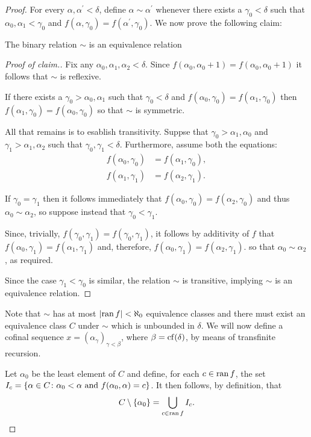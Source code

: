\begin{proof}
	For every $\alpha,\alpha^\prime<\delta$, define $\alpha\sim\alpha^\prime$ whenever there exists a $\gamma_0<\delta$ such that $\alpha_0,\alpha_1<\gamma_0$ and $f(\alpha,\gamma_0)=f(\alpha^\prime,\gamma_0)$.  We now prove the following claim:
	\begin{claim}
		The binary relation $\sim$ is an equivalence relation
	\end{claim}
	\begin{proof}[Proof of claim.]
		Fix any $\alpha_0,\alpha_1,\alpha_2<\delta$.  Since $f(\alpha_0,\alpha_0+1)=f(\alpha_0,\alpha_0+1)$ it follows that $\sim$ is reflexive.

		If there exists a $\gamma_0>\alpha_0,\alpha_1$ such that $\gamma_0<\delta$ and $f(\alpha_0,\gamma_0)=f(\alpha_1,\gamma_0)$ then $f(\alpha_1,\gamma_0)=f(\alpha_0,\gamma_0)$ so that $\sim$ is symmetric.

		All that remains is to esablish transitivity.
		Suppse that $\gamma_0>\alpha_1,\alpha_0$ and $\gamma_1>\alpha_1,\alpha_2$
		such that $\gamma_0,\gamma_1<\delta$.  Furthermore, assume both the
		equations:
		\begin{align}
			f(\alpha_0,\gamma_0)&=f(\alpha_1,\gamma_0),\\
			f(\alpha_1,\gamma_1)&=f(\alpha_2,\gamma_1).
		\end{align}

		If $\gamma_0=\gamma_1$ then it follows immediately that
		$f(\alpha_0,\gamma_0)=f(\alpha_2,\gamma_0)$ and thus
		$\alpha_0\sim\alpha_2$, so suppose instead that $\gamma_0<\gamma_1$.

		Since, trivially, $f(\gamma_0,\gamma_1)=f(\gamma_0,\gamma_1)$, it
		follows by additivity of $f$ that
		$f(\alpha_0,\gamma_1)=f(\alpha_1,\gamma_1)$ and, therefore,
		$f(\alpha_0,\gamma_1)=f(\alpha_2,\gamma_1)$. so that
		$\alpha_0\sim\alpha_2$, as required.\noqed

		Since the case $\gamma_1<\gamma_0$ is similar, the relation $\sim$ is
		transitive, implying $\sim$ is an equivalence relation.
	\end{proof}

	Note that $\sim$ has at most $\left\lvert\operatorname{ran} f\right\rvert<\aleph_0$ equivalence classes
	and there must exist an equivalence class $C$ under $\sim$ which is
	unbounded in $\delta$.  We will now define a cofinal sequence
	$x=(\alpha_{\gamma})_{\gamma<\beta}$, where $\beta=\operatorname{cf}(\delta)$, by means
	of transfinite recursion.

	Let $\alpha_0$ be the least element of $C$ and define, for each $c\in\operatorname{ran}
	f$, the set $I_c=\left\lbrace \alpha\in C\colon \alpha_0<\alpha\text{ and
	}f(\alpha_0,\alpha)=c \right\rbrace$.  It then follows, by definition, that
	\begin{equation}
		C\setminus\left\lbrace \alpha_0\right\rbrace=\bigcup_{c\in\operatorname{ran} f}I_c.
	\end{equation}


\end{proof}
